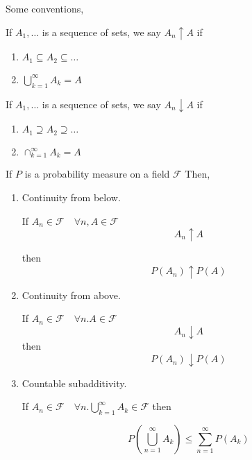 \documentclass[11pt,fleqn]{book} %
\begin{document}
Some conventions, 

If $A_1, \dots$ is a sequence of sets, we say $A_n \uparrow A$ if 

\begin{enumerate}
 	\item $A_1 \subseteq A_2 \subseteq \dots$
 	\item $\displaystyle \bigcup^\infty_{k=1} A_k = A$
 \end{enumerate} 
\vspace{5mm}
 If $A_1, \dots$ is a sequence of sets, we say $A_n \downarrow A$ if 

\begin{enumerate}
 	\item $A_1 \supseteq A_2 \supseteq \dots$
 	\item $\displaystyle \cap^\infty_{k=1} A_k = A$
 \end{enumerate} 

 \begin{theorem}
 	If $P$ is a probability measure on a field $\mathcal{F}$ Then, 

 	\begin{enumerate}
 		\item Continuity from below.

 		If $A_n \in \mathcal{F} \quad \forall n, A \in \mathcal{F}$
 		$$ A_n \uparrow A$$

 		then $$P(A_n) \uparrow P(A)$$

 		\item Continuity from above.

 		If $A_n \in \mathcal{F} \quad \forall n. A \in \mathcal{F}$  
 			$$A_n \downarrow A$$
 		 then $$P(A_n) \downarrow P(A)$$

 		\item Countable subadditivity.

 		If $A_n \in \mathcal{F} \quad \forall n. \displaystyle \bigcup^\infty_{k=1} A_k \in \mathcal{F}$ then 

 		$$P(\displaystyle \bigcup^\infty_{n=1} A_k) \leq \displaystyle \sum^\infty_{n=1} P(A_k)$$
 	\end{enumerate}
 \end{theorem}
\end{document}
